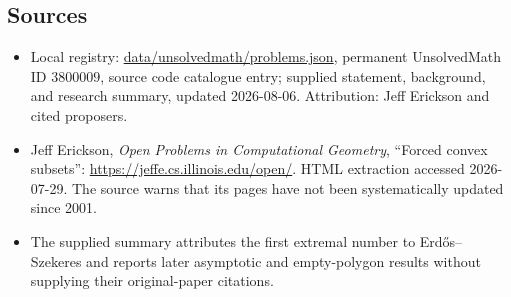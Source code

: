 \documentclass[11pt]{article}
\begin{document}
\subsection{Sources}
\begin{itemize}
\item Local registry: \url{data/unsolvedmath/problems.json}, permanent UnsolvedMath ID \(3800009\), source code catalogue entry; supplied statement, background, and research summary, updated 2026-08-06. Attribution: Jeff Erickson and cited proposers.
\item Jeff Erickson, \emph{Open Problems in Computational Geometry}, ``Forced convex subsets'': \url{https://jeffe.cs.illinois.edu/open/}. HTML extraction accessed 2026-07-29. The source warns that its pages have not been systematically updated since 2001.
\item The supplied summary attributes the first extremal number to Erd\H{o}s--Szekeres and reports later asymptotic and empty-polygon results without supplying their original-paper citations.
\end{itemize}
\end{document}

